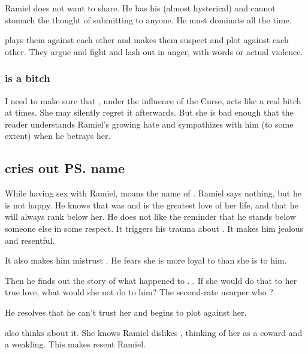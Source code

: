 \begin{garbage}
Ramiel does not want to share. 
He has his (almost hysterical)  and cannot stomach the thought of submitting to anyone. 
He must dominate all the time. 

\hs{\NexagglachelsCurse} plays them against each other and makes them suspect and plot against each other. 
They argue and fight and lash out in anger, with words or actual violence. 





\subsubsection{\Belzir{} is a bitch}
I need to make sure that \Belzir, under the influence of the Curse, acts like a real bitch at times. 
She may silently regret it afterwards. 
But she is bad enough that the reader understands Ramiel's growing hate and sympathizes with him (to some extent) when he betrays her. 









\subsection{\Belzir{} cries out \ps{\Aryal} name}
While having sex with Ramiel, \Belzir{} moans the name of \Aryal. 
Ramiel says nothing, but he is not happy. 
He knows that \Aryal{} was and is the greatest love of her life, and that he will always rank below her.
He does not like the reminder that he stands below someone else in some respect. 
It triggers his trauma about . 
It makes him jealous and resentful. 

It also makes him mistrust \Shiaraid. 
He fears she is more loyal to \Aryal{} than she is to him. 

Then he finds out the story of what happened to \Aryal. 
\Shiaraid{} . 
If she would do that to her true love, what would she not do to him? 
The second-rate usurper who ? 

He resolves that he can't trust her and begins to plot against her. 

\Shiaraid{} also thinks about it. 
She knows Ramiel dislikes \Aryal, thinking of her as a coward and a weakling. 
This makes \Shiaraid{} resent Ramiel. 









\end{garbage}
